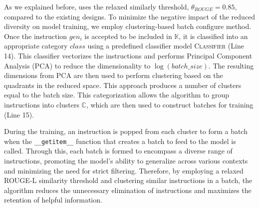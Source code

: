 \begin{comment}
\cancel{
To minimize the negative impact of reduced diversity on model training, we
employ clustering-based batch configure method. Once an instruction is accepted,
it is classified into an appropriate category using a predefined classifier
model. This classifier vectorizes the instructions and performs PCA (Principal
Component Analysis) to reduce the dimensionality to $\log({batch\_size})$. The
resulting dimensions from the PCA are then used to perform clustering based on
the quadrants in the reduced space. This approach results in the creation of a
number of clusters equal to the batch size. This categorization allows the
algorithm to group instructions into clusters ($\mathbb{C}$), which are then used to
structure the batches for training.
}
\end{comment}

As we explained before, \ours{} uses the relaxed similarly threshold,
$\theta_{ROUGE} = 0.85$, compared to the existing designs.
To minimize the negative impact of the reduced diversity on model training, 
we employ clustering-based batch configure method. 
Once the instruction $gen_i$ is accepted to be included in $\mathbb{K}$,
it is classified into an appropriate category $class$ using 
a predefined classifier model \textsc{Classifier} (Line 14). 
This classifier vectorizes the instructions and performs  
Principal Component Analysis (PCA) to reduce the dimensionality 
to $\log({batch\_size})$. The
resulting dimensions from PCA are then used to perform clustering based on
the quadrants in the reduced space. 
This approach produces a number of clusters equal to the batch size.
This categorization allows the
algorithm to group instructions into clusters $\mathbb{C}$, 
which are then used to construct batches for training (Line 15).

During the training, %
an instruction is popped from each cluster to form a batch
when the \texttt{\_\_getitem\_\_} function that creates a batch 
to feed to the model is called.
Through this, each batch is formed to encompass a diverse range of
instructions, promoting the model's ability to generalize across various
contexts and minimizing the need for strict filtering. Therefore, by employing a
relaxed ROUGE-L similarity threshold and clustering similar instructions 
in a batch, the algorithm reduces the unnecessary elimination of instructions 
and maximizes the retention of helpful information.

